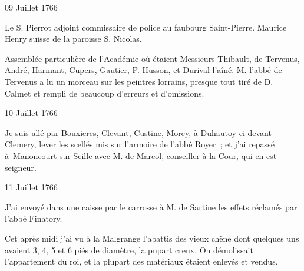                      \begin{diary}{09 Juillet 1766}{}
                        
                        
                           Le S. Pierrot adjoint commissaire de
                           police au
                              faubourg
                              Saint-Pierre. Maurice
                              Henry suisse
                           de la paroisse S. Nicolas.
                        \bigskip
        
        
                         Assemblée particulière de l'Académie où
                           étaient Messieurs
                           Thibault, de Tervenus, André,
                           Harmant, Cupers, Gautier,
                              P. Husson,
                           et Durival l'aîné. M. l'abbé de Tervenus
                           a lu un morceau sur les peintres lorrains,
                           presque tout tiré de D. Calmet et
                           rempli
                           de beaucoup d'erreurs et d'omissions. \bigskip
        
        
                     \end{diary}

                     \begin{diary}{10 Juillet 1766}{}
                        
                         Je suis allé par Bouxieres, Clevant, Custine,
                           Morey, à Duhautoy
                           ci-devant
                           Clemery, lever les
                           scellés mis sur l'armoire de l'abbé
                              Royer ; et j'ai repassé à Manoncourt-sur-Seille avec M.
                              de Marcol, conseiller à la Cour, qui en est
                           seigneur. \bigskip
        
        
                     \end{diary}

                     \begin{diary}{11 Juillet 1766}{}
                        
                         J'ai envoyé dans une caisse par le carrosse
                           à M. de Sartine les effets
                           réclamés par l'abbé
                              Finatory.
                        \bigskip
        
        
                         Cet après midi j'ai vu à la Malgrange
                           l'abattis des vieux chêne dont quelques uns
                           avaient 3, 4, 5 et 6 piés de diamètre, la
                           pupart creux. On démolissait l'appartement du
                           roi, et la plupart des
                           matériaux étaient
                           enlevés et vendus. \bigskip
        
        
                     \end{diary}

